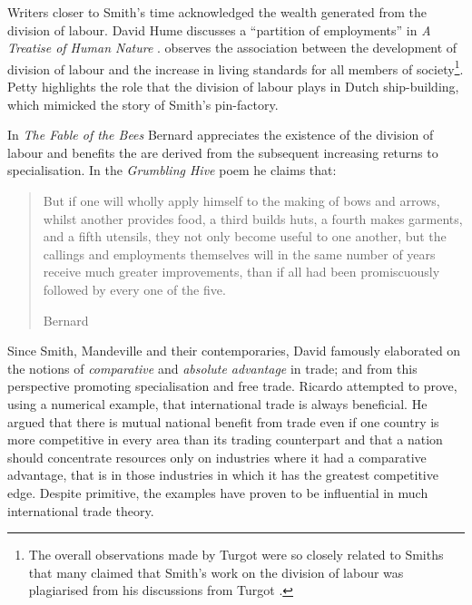 

Writers closer to Smith's time acknowledged the wealth generated from the division of labour. David Hume discusses a ``partition of employments'' in \emph{A Treatise of Human Nature} \citep{Hume1740}. \citet{Turgot1774} observes the association between the development of division of labour and the increase in living standards for all members of society\footnote{The overall observations made by Turgot were so closely related to Smiths that many claimed that Smith's work on the division of labour was plagiarised from his discussions from Turgot \citep{YangNg1998}.}. Petty highlights the role that the division of labour plays in Dutch ship-building, which mimicked the story of Smith's pin-factory.

In \emph{The Fable of the Bees} Bernard \citet{Mandeville1795} appreciates the existence of the division of labour and benefits the are derived from the subsequent increasing returns to specialisation. In the \emph{Grumbling Hive} poem he claims that:

\begin{quote}
But if one will wholly apply himself to the making of bows and arrows, whilst another provides food, a third builds huts, a fourth makes garments, and a fifth utensils, they not only become useful to one another, but the callings and employments themselves will in the same number of years receive much greater improvements, than if all had been promiscuously followed by every one of the five.

\begin{flushright}
Bernard \citet[p.~465]{Mandeville1795}
\end{flushright}
\end{quote}

Since Smith, Mandeville and their contemporaries, David \citet{Ricardo1817} famously elaborated on the notions of \emph{comparative} and \emph{absolute advantage} in trade; and from this perspective promoting specialisation and free trade. Ricardo attempted to prove, using a numerical example, that international trade is always beneficial. He argued that there is mutual national benefit from trade even if one country is more competitive in every area than its trading counterpart and that a nation should concentrate resources only on industries where it had a comparative advantage, that is in those industries in which it has the greatest competitive edge. Despite primitive, the examples have proven to be influential in much international trade theory.

